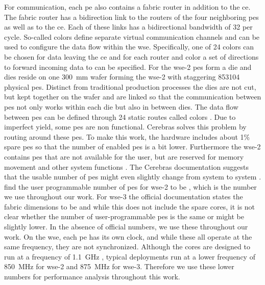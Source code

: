 For communication, each \ac{pe} also contains a fabric router in addition to the \ac{ce}. The fabric router has a bidirection link to the routers of the four neighboring \acp{pe} as well as to the \ac{ce}. Each of these links has a bidirectional bandwidth of \qty{32}{\bit} per cycle. So-called colors define separate virtual communication channels and can be used to configure the data flow within the \ac{wse}. Specifically, one of 24 colors can be chosen for data leaving the \ac{ce} and for each router and color a set of directions to forward incoming data to can be specified. For the \ac{wse}-2  \acp{pe} form a die and  dies reside on one \qty{300}{\mm} wafer forming the \ac{wse}-2 with staggering \num{853104} physical \acp{pe}. Distinct from traditional production processes the dies are not cut, but kept together on the wafer and are linked so that the communication between \acp{pe} not only works within each die but also in between dies.
The data flow between \acp{pe} can be defined through 24 static routes called colors \cite{lie2023cerebras}.
Due to imperfect yield, some \acp{pe} are non functional.
Cerebras solves this problem by routing around these \acp{pe}. 
To make this work, the hardware includes about 1\% spare \acp{pe} so that the number of enabled \acp{pe} is a bit lower. Furthermore the \ac{wse}-2 contains \acp{pe} that are not available for the user, but are reserved for memory movement and other system functions \cite{tramm2024efficient}.
The Cerebras documentation suggests that the usable number of \acp{pe} might even slightly change from system to system \cite{cerebras_gemv_tutorial}. \citeauthor{tramm2024efficient} \cite{tramm2024efficient} find the user programmable number of \acp{pe} for \ac{wse}-2 to be , which is the number we use throughout our work. For \ac{wse}-3 the official documentation states the fabric dimensions to be  and while this does not include the spare cores, it is not clear whether the number of user-programmable \acp{pe} is the same or might be slightly lower. In the absence of official numbers, we use these throughout our work. On the \ac{wse}, each \ac{pe} has its own clock, and while these all operate at the same frequency, they are not synchronized. Although the cores are designed to run at a frequency of \qty{1.1}{\giga\hertz} \cite{lie2023cerebras}, typical deployments run at a lower frequency of \qty{850}{\mega\hertz} for \ac{wse}-2 \cite{tramm2024efficient} and \qty{875}{\mega\hertz} for \ac{wse}-3. Therefore we use these lower numbers for performance analysis throughout this work.

